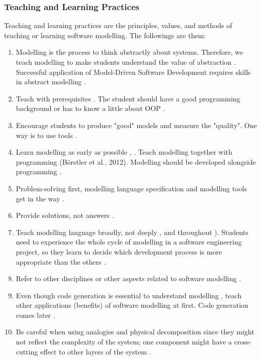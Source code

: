 \documentclass[12pt, a4paper]{report}
\begin{document}
\subsubsection{Teaching and Learning Practices}
Teaching and learning practices are the principles, values, and methods of teaching or learning software modelling. The followings are them:
\begin{enumerate}
\item Modelling is the process to think abstractly about systems. Therefore, we teach modelling to make students understand the value of abstraction \cite{bezivin2009teaching}. Successful application of Model-Driven Software Development requires skills in abstract modelling \cite{whittle2013industrial}.
\item Teach with prerequisites \cite{paige2014bad}. The student should have a good programming background \cite{bezivin2009teaching} or has to know a little about OOP \cite{Akayama2013}.
\item Encourage students to produce "good" models and measure the "quality". One way is to use tools \cite{Akayama2013}.
\item Learn modelling as early as possible \cite{Akayama2013}, \cite{borstler2012teaching}. Teach modelling together with programming (Börstler et al., 2012). Modelling should be developed alongside programming \cite{bezivin2009teaching}.
\item Problem-solving first, modelling language specification and modelling tools get in the way \cite{paige2014bad}.
\item Provide solutions, not answers \cite{paige2014bad}.
\item Teach modelling language broadly, not deeply \cite{paige2014bad}, and throughout \cite{borstler2012teaching}). Students need to experience the whole cycle of modelling in a software engineering project, so they learn to decide which development process is more appropriate than the others \cite{Akayama2013}.
\item Refer to other disciplines or other aspects related to software modelling \cite{paige2014bad}.
\item Even though code generation is essential to understand modelling \cite{liebel2015ready}, teach other applications (benefits) of software modelling at first. Code generation comes later \cite{paige2014bad}.
\item Be careful when using analogies and physical decomposition since they might not reflect the complexity of the system; one component might have a cross-cutting effect to other layers of the system \cite{paige2014bad}. 

\end{enumerate}
\end{document}
